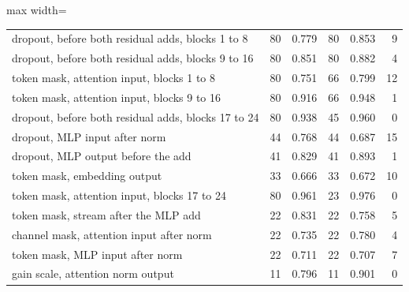 \begin{table}[htbp]
\begin{adjustbox}{max width=\linewidth}
\begin{tabular}{lrrrrr}
dropout, before both residual adds, blocks 1 to 8 & 80 & 0.779 & 80 & 0.853 & 9 \\
dropout, before both residual adds, blocks 9 to 16 & 80 & 0.851 & 80 & 0.882 & 4 \\
token mask, attention input, blocks 1 to 8 & 80 & 0.751 & 66 & 0.799 & 12 \\
token mask, attention input, blocks 9 to 16 & 80 & 0.916 & 66 & 0.948 & 1 \\
dropout, before both residual adds, blocks 17 to 24 & 80 & 0.938 & 45 & 0.960 & 0 \\
dropout, MLP input after norm & 44 & 0.768 & 44 & 0.687 & 15 \\
dropout, MLP output before the add & 41 & 0.829 & 41 & 0.893 & 1 \\
token mask, embedding output & 33 & 0.666 & 33 & 0.672 & 10 \\
token mask, attention input, blocks 17 to 24 & 80 & 0.961 & 23 & 0.976 & 0 \\
token mask, stream after the MLP add & 22 & 0.831 & 22 & 0.758 & 5 \\
channel mask, attention input after norm & 22 & 0.735 & 22 & 0.780 & 4 \\
token mask, MLP input after norm & 22 & 0.711 & 22 & 0.707 & 7 \\
gain scale, attention norm output & 11 & 0.796 & 11 & 0.901 & 0 \\
\bottomrule
\end{tabular}
\end{adjustbox}
\end{table}
